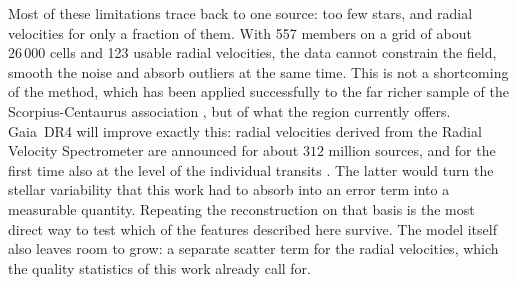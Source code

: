 Most of these limitations trace back to one source: too few stars, and radial velocities for only a
fraction of them. With 557 members on a grid of about $26\,000$ cells and 123 usable radial velocities,
the data cannot constrain the field, smooth the noise and absorb outliers at the same time. This is
not a shortcoming of the method, which has been applied successfully to the far richer sample of
the Scorpius-Centaurus association \citep{Hutschenreuter2026}, but of what the region currently
offers. Gaia~DR4 will improve
exactly this: radial velocities derived from the Radial Velocity Spectrometer are announced for
about $312$ million sources, and for the first time also at the level of the individual transits
\citep{GaiaDR4}. The latter would turn the stellar variability that this work had to absorb into an
error term into a measurable quantity. Repeating the reconstruction on that basis is the most direct
way to test which of the features described here survive. The model itself also
leaves room to grow: a separate scatter term for the radial velocities, which the quality statistics of this
work already call for.
